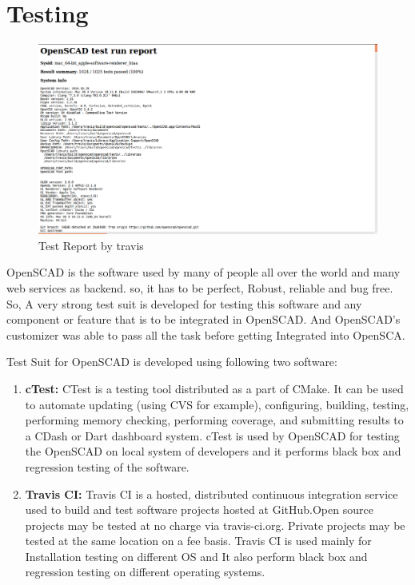 \section{Testing}

\begin{figure}[H]
	\centering
	\includegraphics[width=0.8\linewidth]{images/travisTestReport}
	\caption{Test Report by travis}
	\label{fig:travisTestReport}
\end{figure}

OpenSCAD is the software used by many of people all over the world and many web services as backend. so, it has to be perfect, Robust, reliable and bug free. So, A very strong test suit is developed for testing this software and any component or feature that is to be integrated in OpenSCAD. And OpenSCAD's customizer was able to pass all the task before getting Integrated into OpenSCA. 

Test Suit for OpenSCAD is developed using following two software:

\begin{enumerate}
	\item \textbf{cTest:} CTest is a testing tool distributed as a part of CMake. It can be used to automate updating (using CVS for example), configuring, building, testing, performing memory checking, performing coverage, and submitting results to a CDash or Dart dashboard system.
	cTest is used by OpenSCAD for testing the OpenSCAD on local system of developers and it performs black box and regression testing of the software.
	
	\item \textbf{Travis CI:} Travis CI is a hosted, distributed continuous integration service used to build and test software projects hosted at GitHub.Open source projects may be tested at no charge via travis-ci.org. Private projects may be tested at the same location on a fee basis.
	Travis CI is used mainly for Installation testing on different OS and It also perform  black box and regression testing on different operating systems.
	
\end{enumerate}

